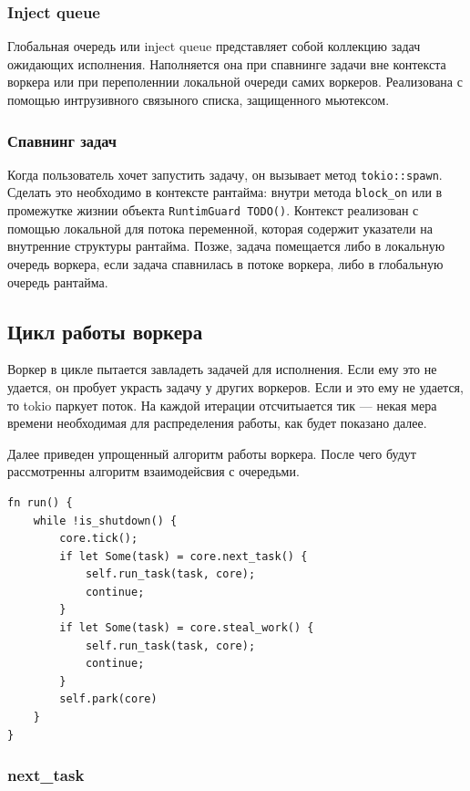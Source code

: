 \subsubsection{Inject queue}

Глобальная очередь или inject queue представляет собой коллекцию задач ожидающих исполнения.  Наполняется она при спавнинге задачи вне контекста воркера или при переполеннии локальной очереди самих воркеров. Реализована с помощью интрузивного связыного списка, защищенного мьютексом.

\subsubsection{Спавнинг задач}

Когда пользователь хочет запустить задачу, он вызывает метод \verb|tokio::spawn|. Сделать это необходимо в контексте рантайма: внутри метода \verb|block_on| или в промежутке жизнии объекта \verb|RuntimGuard TODO()|. Контекст реализован с помощью локальной для потока переменной, которая содержит указатели на внутренние структуры рантайма. Позже, задача помещается либо в локальную очередь воркера, если задача спавнилась в потоке воркера, либо в глобальную очередь рантайма.

\newpage

\subsection{Цикл работы воркера}

Воркер в цикле пытается завладеть задачей для исполнения. Если ему это не удается, он пробует украсть задачу у других воркеров. Если и это ему не удается, то tokio паркует поток. На каждой итерации отсчитыается тик --- некая мера времени необходимая для распределения работы, как будет показано далее.

Далее приведен упрощенный алгоритм работы воркера. После чего будут рассмотренны алгоритм взаимодейсвия с очередьми.

\begin{verbatim}
fn run() {
    while !is_shutdown() {
        core.tick();
        if let Some(task) = core.next_task() {
            self.run_task(task, core);
            continue;
        }
        if let Some(task) = core.steal_work() {
            self.run_task(task, core);
            continue;
        }
        self.park(core)
    }
}
\end{verbatim}

\subsubsection{next_task}

